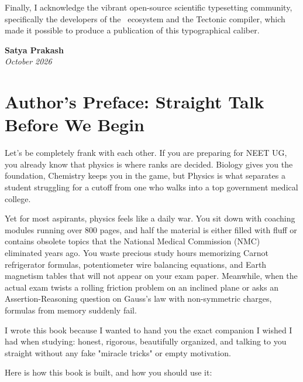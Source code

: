 \documentclass[10pt,twoside,openright]{book}
\begin{document}
Finally, I acknowledge the vibrant open-source scientific typesetting community, specifically the developers of the \LaTeXe\ ecosystem and the Tectonic compiler, which made it possible to produce a publication of this typographical caliber.

\vspace{1cm}
\begin{flushright}
  \textbf{Satya Prakash}\\
  \textit{October 2026}
\end{flushright}
\cleardoublepage

\chapter*{Author's Preface: Straight Talk Before We Begin}

Let's be completely frank with each other. If you are preparing for NEET UG, you already know that physics is where ranks are decided. Biology gives you the foundation, Chemistry keeps you in the game, but Physics is what separates a student struggling for a cutoff from one who walks into a top government medical college.

Yet for most aspirants, physics feels like a daily war. You sit down with coaching modules running over 800 pages, and half the material is either filled with fluff or contains obsolete topics that the National Medical Commission (NMC) eliminated years ago. You waste precious study hours memorizing Carnot refrigerator formulas, potentiometer wire balancing equations, and Earth magnetism tables that will not appear on your exam paper. Meanwhile, when the actual exam twists a rolling friction problem on an inclined plane or asks an Assertion-Reasoning question on Gauss's law with non-symmetric charges, formulas from memory suddenly fail.

I wrote this book because I wanted to hand you the exact companion I wished I had when studying: honest, rigorous, beautifully organized, and talking to you straight without any fake "miracle tricks" or empty motivation. 

Here is how this book is built, and how you should use it:
\end{document}
